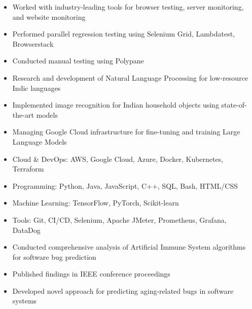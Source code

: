\documentclass[10pt,a4paper,ragged2e]{altacv}
\begin{document}
\divider

\begin{itemize}
	\item Worked with industry-leading tools for browser testing, server monitoring, and website monitoring
	\item Performed parallel regression testing using Selenium Grid, Lambdatest, Browserstack
	\item Conducted manual testing using Polypane
\end{itemize}

\divider

\begin{itemize}
	\item Research and development of Natural Language Processing for low-resource Indic languages
	\item Implemented image recognition for Indian household objects using state-of-the-art models
	\item Managing Google Cloud infrastructure for fine-tuning and training Large Language Models
\end{itemize}

\begin{itemize}
	\item Cloud \& DevOps: AWS, Google Cloud, Azure, Docker, Kubernetes, Terraform
	\item Programming: Python, Java, JavaScript, C++, SQL, Bash, HTML/CSS
	\item Machine Learning: TensorFlow, PyTorch, Scikit-learn
	\item Tools: Git, CI/CD, Selenium, Apache JMeter, Prometheus, Grafana, DataDog
\end{itemize}


\begin{itemize}
	\item Conducted comprehensive analysis of Artificial Immune System algorithms for software bug prediction
	\item Published findings in IEEE conference proceedings
	\item Developed novel approach for predicting aging-related bugs in software systems
\end{itemize}
\end{document}
